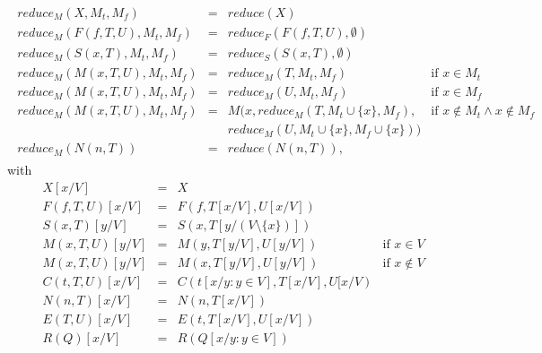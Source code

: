 \documentclass{article}
\begin{document}
\begin{equation*}
\begin{array}{l}
\begin{array}{llll}
reduce_{M}(X,M_{t},M_{f}) & = & reduce(X) &  \\ 
reduce_{M}(F(f,T,U),M_{t},M_{f}) & = & reduce_{F}(F(f,T,U),\emptyset ) &  \\ 
reduce_{M}(S(x,T),M_{t},M_{f}) & = & reduce_{S}(S(x,T),\emptyset ) &  \\ 
reduce_{M}(M(x,T,U),M_{t},M_{f}) & = & reduce_{M}(T,M_{t},M_{f}) & \text{if }%
x\in M_{t} \\ 
reduce_{M}(M(x,T,U),M_{t},M_{f}) & = & reduce_{M}(U,M_{t},M_{f}) & \text{if }%
x\in M_{f} \\ 
reduce_{M}(M(x,T,U),M_{t},M_{f}) & = & M(x,reduce_{M}(T,M_{t}\cup
\{x\},M_{f}), & \text{if }x\notin M_{t}\wedge x\notin M_{f} \\ 
&  & reduce_{M}(U,M_{t}\cup \{x\},M_{f}\cup \{x\})) &  \\ 
reduce_{M}(N(n,T)) & = & reduce(N(n,T)), & 
\end{array}%
\end{array}%
\end{equation*}%
with%
\begin{equation*}
\begin{array}{llll}
X[x/V] & = & X &  \\ 
F(f,T,U)[x/V] & = & F(f,T[x/V],U[x/V]) &  \\ 
S(x,T)[y/V] & = & S(x,T[y/(V\setminus \{x\})]) &  \\ 
M(x,T,U)[y/V] & = & M(y,T[y/V],U[y/V]) & \text{if }x\in V \\ 
M(x,T,U)[y/V] & = & M(x,T[y/V],U[y/V]) & \text{if }x\notin V \\ 
C(t,T,U)[x/V] & = & C(t[x/y:y\in V],T[x/V],U[x/V) &  \\ 
N(n,T)[x/V] & = & N(n,T[x/V]) &  \\ 
E(T,U)[x/V] & = & E(t,T[x/V],U[x/V]) &  \\ 
R(Q)[x/V] & = & R(Q[x/y:y\in V]) & 
\end{array}%
\end{equation*}%
\end{document}
